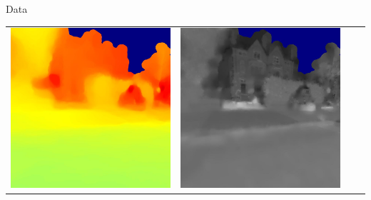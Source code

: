 \begin{frame}{Data}
\begin{tabular}{c c c c}
		\includegraphics[width=\widthcase]{images/dataset/depth_000052_mono_left.jpg} &
		\includegraphics[width=\widthcase]{images/dataset/ref_000052_mono_left.jpg} \\

\end{tabular}
\end{frame}
